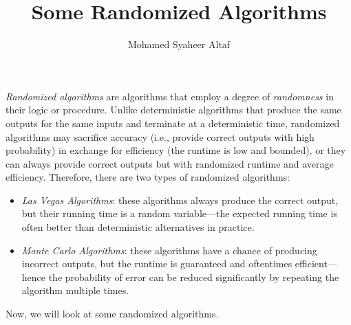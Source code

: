 \documentclass[12pt,a4paper]{article}
\begin{document}
	
	\title{Some Randomized Algorithms}
	\author{Mohamed Syaheer Altaf}
	\maketitle
	
	\emph{Randomized algorithms} are algorithms that employ a degree of \emph{randomness} in their logic or procedure. Unlike deterministic algorithms that produce the same outputs for the same inputs and terminate at a deterministic time, randomized algorithms may sacrifice accuracy (i.e., provide correct outputs with high probability) in exchange for efficiency (the runtime is low and bounded), or they can always provide correct outputs but with randomized runtime and average efficiency. Therefore, there are two types of randomized algorithms:
	\begin{itemize}
		\item \emph{Las Vegas Algorithms}: these algorithms always produce the correct output, but their running time is a random variable---the expected running time is often better than deterministic alternatives in practice.
		\item \emph{Monte Carlo Algorithms}: these algorithms have a chance of producing incorrect outputs, but the runtime is guaranteed and oftentimes efficient---hence the probability of error can be reduced significantly by repeating the algorithm multiple times.
	\end{itemize}
	
	Now, we will look at some randomized algorithms.
	
\end{document}
